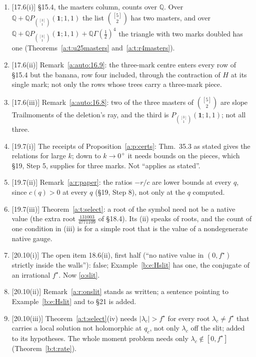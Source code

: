 \documentclass[11pt]{article}
\newcommand{\one}{\mathbf 1}
\newcommand{\Pth}{P_{\binom{[3]}1}(\one;1,1)}
\theoremstyle{plain}
\theoremstyle{definition}
\theoremstyle{remark}
\begin{document}
\begin{enumerate}[label=\textbf{C\arabic*},ref=C\arabic*,leftmargin=*,itemsep=3pt]
\item {\small[17.6(i)]} \S15.4, the masters column, counts over $\mathbb Q$. Over $\mathbb Q+\mathbb Q\Pth$ the list $\binom{[5]}2$ has two masters, and over $\mathbb Q+\mathbb Q\Pth+\mathbb Q\Gamma(\frac12)^4$ the triangle with two marks doubled has one (Theorems~\ref{a:t:u25masters} and~\ref{a:t:r4masters}).
\item {\small[17.6(ii)]} Remark~\ref{a:auto:16.9}: the three-mark centre enters every row of \S15.4 but the banana, row four included, through the contraction of $H$ at its single mark; not only the rows whose trees carry a three-mark piece.
\item {\small[17.6(iii)]} Remark~\ref{a:auto:16.8}: two of the three masters of $\binom{[5]}2$ are slope Trailmoments of the deletion's ray, and the third is $\Pth$; not all three.
\item {\small[19.7(i)]} The receipts of Proposition~\ref{a:p:certs}: Thm.~35.3 as stated gives the relations for large $k$; down to $k\to0^+$ it needs bounds on the pieces, which \S19, Step 5, supplies for three marks. Not ``applies as stated''.
\item {\small[19.7(ii)]} Remark~\ref{a:r:paper}: the ratios $-r/c$ are lower bounds at every $q$, since $c(q)>0$ at every $q$ (\S19, Step 8), not only at the $q$ computed.
\item {\small[19.7(iii)]} Theorem~\ref{a:t:select}: a root of the symbol need not be a native value (the extra root $\frac{131003}{4771109}$ of \S18.4). Its (ii) speaks of roots, and the count of one condition in (iii) is for a simple root that is the value of a nondegenerate native gauge.
\item {\small[20.10(i)]} The open item 18.6(ii), first half (``no native value in $(0,f^\star)$ strictly inside the walls''): false; Example~\ref{b:e:Hslit} has one, the conjugate of an irrational $f^\star$. Now \ref{o:slit}.
\item {\small[20.10(ii)]} Remark~\ref{a:r:onslit} stands as written; a sentence pointing to Example~\ref{b:e:Hslit} and to \S21 is added.
\item {\small[20.10(iii)]} Theorem~\ref{a:t:select}(iv) needs $|\lambda_c|>f^\star$ for every root $\lambda_c\neq f^\star$ that carries a local solution not holomorphic at $q_c$, not only $\lambda_c$ off the slit; added to its hypotheses. The whole moment problem needs only $\lambda_c\notin[0,f^\star]$ (Theorem~\ref{b:t:rate}).

\end{enumerate}
\end{document}

